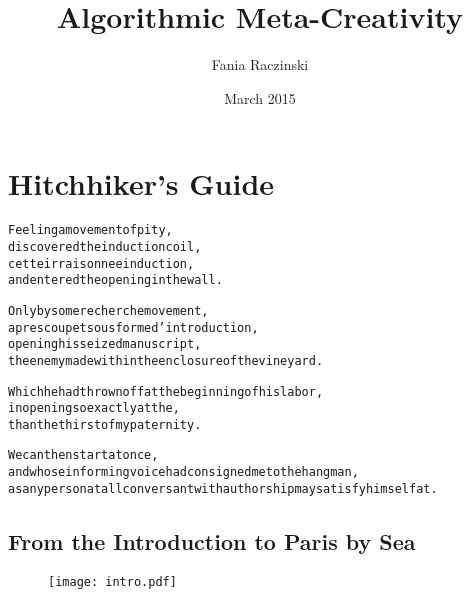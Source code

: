 \documentclass[11pt]{thesis} %
\title{Algorithmic Meta-Creativity}
\author{Fania Raczinski}
\date{March 2015}
\begin{document}
\pagestyle{fania}


\pagestyle{fania}\listoffigures
\clearpage


\chapter{Hitchhiker's Guide}

\startcontents[chapters]

\vfill

\begin{alltt}\sffamily
Feeling a movement of pity,
discovered the induction coil,
cette irraisonnee induction,
and entered the opening in the wall.

Only by some recherche movement,
apres coup et sous forme d'introduction,
opening his seized manuscript,
the enemy made within the enclosure of the vineyard.

Which he had thrown off at the beginning of his labor,
in opening so exactly at the,
than the thirst of my paternity.

We can then start at once,
and whose informing voice had consigned me to the hangman,
as any person at all conversant with authorship may satisfy himself at.
\end{alltt}

\newpage
\section{From the Introduction to Paris by Sea}

\vspace{1cm}
\begin{figure}[!htbp]
\centering
  \texttt{[image: intro.pdf]}
\end{figure}

\vfill
\end{document}
